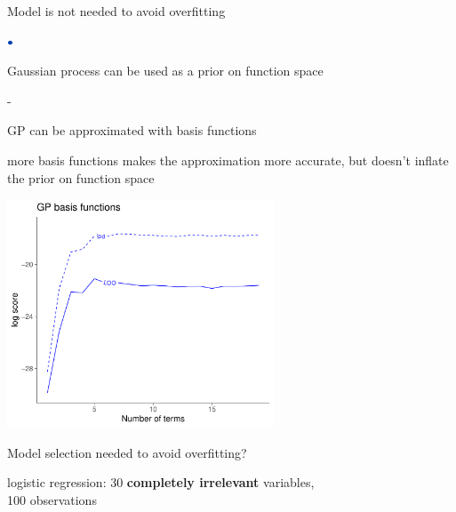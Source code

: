 \documentclass[english,t]{beamer}
\newenvironment{list1}{
   \begin{list}{$\color{list1}\bullet$}{\itemsep=6pt}}{
  \end{list}}
\newenvironment{list2}{
  \begin{list}{-}{\baselineskip=12pt\itemsep=2pt}}{
  \end{list}}
\begin{document}
\begin{frame}{Model is not needed to avoid overfitting}

\begin{list1}
\item Gaussian process can be used as a prior on function space
  \begin{list2}
  \item GP can be approximated with basis functions
  \item more basis functions makes the approximation more
    accurate, but doesn't inflate the prior on function space
  \end{list2}
\end{list1}
\vspace{-0.5\baselineskip}
{\includegraphics[height=6.8cm]{overfit_elpd_GP.pdf}}

\end{frame}

\begin{frame}{Model selection needed to avoid overfitting?}

  logistic regression: 30 \textbf{completely irrelevant} variables, \\100
  observations
  

\end{frame}
\end{document}
